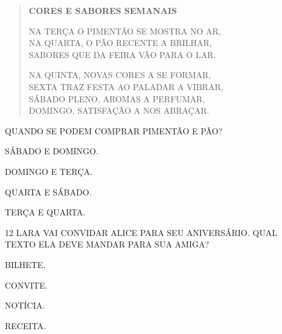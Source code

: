 \begin{myquote}
\begin{verse}
\textbf{CORES E SABORES SEMANAIS}

NA TERÇA O PIMENTÃO SE MOSTRA NO AR,\\
NA QUARTA, O PÃO RECENTE A BRILHAR,\\
SABORES QUE DA FEIRA VÃO PARA O LAR.


NA QUINTA, NOVAS CORES A SE FORMAR,\\
SEXTA TRAZ FESTA AO PALADAR A VIBRAR,\\
SÁBADO PLENO, AROMAS A PERFUMAR,\\
DOMINGO, SATISFAÇÃO A NOS ABRAÇAR.
\end{verse}

\end{myquote}


\pagebreak

QUANDO SE PODEM COMPRAR PIMENTÃO E PÃO?

\begin{escolha}
\item SÁBADO E DOMINGO.

\item DOMINGO E TERÇA.

\item QUARTA E SÁBADO.

\item TERÇA E QUARTA.
\end{escolha}

\num{12} LARA VAI CONVIDAR ALICE PARA SEU ANIVERSÁRIO. 
QUAL TEXTO ELA DEVE MANDAR PARA SUA AMIGA? 

\begin{escolha}
\item BILHETE.

\item CONVITE.

\item NOTÍCIA.

\item RECEITA.
\end{escolha}

